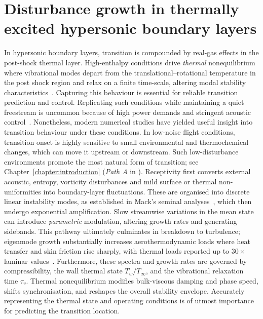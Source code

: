 \chapter{Disturbance growth in thermally excited hypersonic
boundary layers}\label{chapter:disturbance_growth}

In hypersonic boundary layers, transition is compounded by real-gas effects in the post-shock thermal layer. High-enthalpy conditions drive \emph{thermal} nonequilibrium where vibrational modes depart from the translational--rotational temperature in the post shock region and relax on a finite time-scale, altering modal stability characteristics~\cite{Candler2019}. Capturing this behaviour is essential for reliable transition prediction and control. Replicating such conditions while maintaining a quiet freestream is uncommon because of high power demands and stringent acoustic control~\cite{DiRenzo2021}. Nonetheless, modern numerical studies have yielded useful insight into transition behaviour under these conditions. In low-noise flight conditions, transition onset is highly sensitive to small environmental and thermochemical changes, which can move it upstream or downstream. Such low-disturbance environments promote the most natural form of transition; see Chapter~\ref{chapter:introduction} (\textit{Path A} in ). Receptivity first converts external acoustic, entropy, vorticity disturbances and mild surface or thermal non-uniformities into boundary-layer fluctuations. These are organised into discrete linear instability modes, as established in Mack’s seminal analyses~\cite{Mack1984}, which then undergo exponential amplification. Slow streamwise variations in the mean state can introduce \emph{parametric} modulation, altering growth rates and generating sidebands. This pathway ultimately culminates in breakdown to turbulence; eigenmode growth substantially increases aerothermodynamic loads where heat transfer and skin friction rise sharply, with thermal loads reported up to \(30\times\) laminar values~\cite{BitterShepherd2015}. Furthermore, these spectra and growth rates are governed by compressibility, the wall thermal state \(T_w/T_\infty\), and the vibrational relaxation time \(\tau_v\). Thermal nonequilibrium modifies bulk-viscous damping and phase speed, shifts synchronisation, and reshapes the overall stability envelope. Accurately representing the thermal state and operating conditions is of utmost importance for predicting the transition location.





